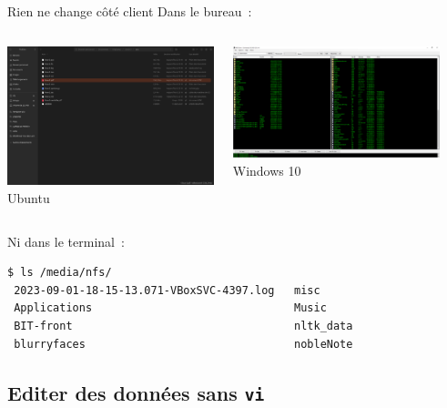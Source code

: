 \documentclass{beamer}
\begin{document}
    \begin{frame}[fragile]{Rien ne change côté client}
        Dans le bureau~:
        \begin{columns}
            \begin{center}
                \includegraphics[width=6cm]{image/nfs-linux} \\ Ubuntu \\
            \end{center}
            \begin{center}
                \includegraphics[width=6cm]{image/nfs-windows} \\ Windows 10 \\
            \end{center}
        \end{columns}
        \bigbreak
        Ni dans le terminal~:
        \begin{lstlisting}[language=bash]
$ ls /media/nfs/
 2023-09-01-18-15-13.071-VBoxSVC-4397.log   misc
 Applications                               Music
 BIT-front                                  nltk_data
 blurryfaces                                nobleNote
        \end{lstlisting}
    \end{frame}

    \subsection{Editer des données sans \lstinline{vi}}\label{subsec:edit-whithout-vi}
\end{document}
